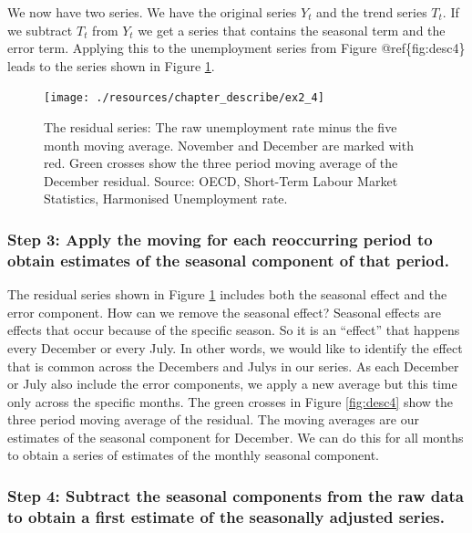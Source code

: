 \documentclass[
]{book}
\begin{document}
We now have two series. We have the original series \(Y_t\) and the trend series \(T_t\). If we subtract \(T_t\) from \(Y_t\) we get a series that contains the seasonal term and the error term. Applying this to the unemployment series from Figure @ref\{fig:desc4\} leads to the series shown in Figure \ref{fig:desc6}.

\begin{figure}

{\centering \texttt{[image: ./resources/chapter\_describe/ex2\_4]} 

}

\caption{The residual series: The raw unemployment rate minus the five month moving average. November and December are marked with red. Green crosses show the three period moving average of the December residual. Source: OECD, Short-Term Labour Market Statistics, Harmonised Unemployment rate.}\label{fig:desc6}
\end{figure}

\hypertarget{step-3-apply-the-moving-for-each-reoccurring-period-to-obtain-estimates-of-the-seasonal-component-of-that-period.}{%
\subsubsection*{Step 3: Apply the moving for each reoccurring period to obtain estimates of the seasonal component of that period.}\label{step-3-apply-the-moving-for-each-reoccurring-period-to-obtain-estimates-of-the-seasonal-component-of-that-period.}}

The residual series shown in Figure \ref{fig:desc6} includes both the seasonal effect and the error component. How can we remove the seasonal effect? Seasonal effects are effects that occur because of the specific season. So it is an ``effect'' that happens every December or every July. In other words, we would like to identify the effect that is common across the Decembers and Julys in our series. As each December or July also include the error components, we apply a new average but this time only across the specific months. The green crosses in Figure \ref{fig:desc4} show the three period moving average of the residual. The moving averages are our estimates of the seasonal component for December. We can do this for all months to obtain a series of estimates of the monthly seasonal component.

\hypertarget{step-4-subtract-the-seasonal-components-from-the-raw-data-to-obtain-a-first-estimate-of-the-seasonally-adjusted-series.}{%
\subsubsection*{Step 4: Subtract the seasonal components from the raw data to obtain a first estimate of the seasonally adjusted series.}\label{step-4-subtract-the-seasonal-components-from-the-raw-data-to-obtain-a-first-estimate-of-the-seasonally-adjusted-series.}}
\end{document}
